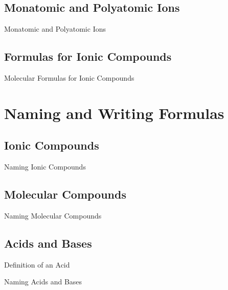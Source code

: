 \documentclass[11pt]{beamer}
\begin{document}
\subsection{Monatomic and Polyatomic Ions}

\begin{frame}{Monatomic and Polyatomic Ions}
\end{frame}

\subsection{Formulas for Ionic Compounds}

\begin{frame}{Molecular Formulas for Ionic Compounds}
\end{frame}

\section{Naming and Writing Formulas}

\subsection{Ionic Compounds}

\begin{frame}{Naming Ionic Compounds}
\end{frame}

\subsection{Molecular Compounds}

\begin{frame}{Naming Molecular Compounds}
\end{frame}

\subsection{Acids and Bases}

\begin{frame}{Definition of an Acid}
\end{frame}

\begin{frame}{Naming Acids and Bases}
\end{frame}
\end{document}
